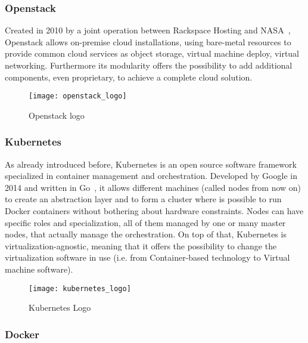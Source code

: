 \subsubsection{Openstack}
\label{chap:prjan:sec:openstack}
Created in 2010 by a joint operation between Rackspace Hosting and
NASA~\cite{openstackWebsite}, Openstack allows on-premise cloud installations,
using bare-metal resources to provide common cloud services as object storage,
virtual machine deploy, virtual networking. Furthermore its modularity offers
the possibility to add additional components, even proprietary, to achieve a
complete cloud solution.
\begin{figure}[t]
 \centering \texttt{[image: openstack\_logo]}
 \caption{Openstack logo}
 \label{chap:prjan:img:openstack_logo}
\end{figure}

\subsubsection{Kubernetes}

As already introduced before, Kubernetes is an open source software framework
specialized in container management and orchestration. Developed by Google in
2014 and written in Go~\cite{k8sGit}, it allows different machines (called nodes
from now on) to create an abstraction layer and to form a cluster where is
possible to run Docker containers without bothering about hardware constraints.
Nodes can have specific roles and specialization, all of them managed by one or
many master nodes, that actually manage the orchestration. On top of that,
Kubernetes is virtualization-agnostic, meaning that it offers the possibility to
change the virtualization software in use (i.e. from Container-based technology
to Virtual machine software).
\begin{figure}[h]
 \centering \texttt{[image: kubernetes\_logo]}
 \caption{Kubernetes Logo}
 \label{chap:intro:img:k8s_logo}
\end{figure}


\subsubsection{Docker}

